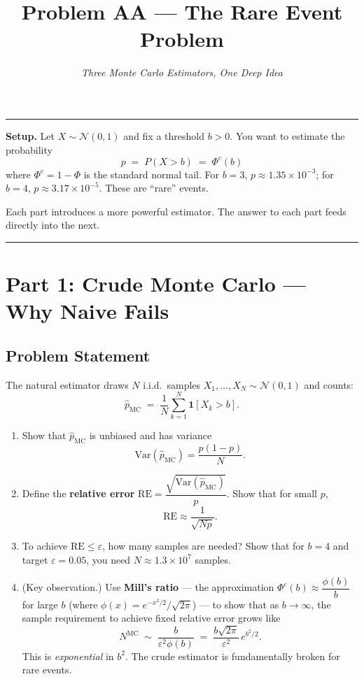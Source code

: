 \documentclass[12pt]{article}
\title{\textbf{Problem AA --- The Rare Event Problem}}
\author{\textit{Three Monte Carlo Estimators, One Deep Idea}}
\date{}
\begin{document}
\maketitle

\hrule
\bigskip

\noindent
\textbf{Setup.}
Let $X \sim \mathcal{N}(0,1)$ and fix a threshold $b > 0$.
You want to estimate the probability
\[
  p \;=\; P(X > b) \;=\; \Phi^c(b)
\]
where $\Phi^c = 1 - \Phi$ is the standard normal tail.
For $b = 3$, $p \approx 1.35 \times 10^{-3}$; for $b = 4$, $p \approx 3.17 \times 10^{-5}$.
These are ``rare'' events.

Each part introduces a more powerful estimator.
The answer to each part feeds directly into the next.

\bigskip\hrule\bigskip

\section*{\textcolor{sectionblue}{Part 1: Crude Monte Carlo --- Why Naive Fails}}

\subsection*{Problem Statement}

The natural estimator draws $N$ i.i.d.\ samples $X_1, \ldots, X_N \sim \mathcal{N}(0,1)$ and counts:
\[
  \hat{p}_{\mathrm{MC}} \;=\; \frac{1}{N}\sum_{k=1}^{N} \mathbf{1}[X_k > b].
\]

\begin{enumerate}[label=(\alph*)]

  \item Show that $\hat{p}_{\mathrm{MC}}$ is unbiased and has variance
  \[
    \mathrm{Var}(\hat{p}_{\mathrm{MC}}) = \frac{p(1-p)}{N}.
  \]

  \item Define the \textbf{relative error}
  $\mathrm{RE} = \dfrac{\sqrt{\mathrm{Var}(\hat{p}_{\mathrm{MC}})}}{p}$.
  Show that for small $p$,
  \[
    \mathrm{RE} \approx \frac{1}{\sqrt{N p}}.
  \]

  \item To achieve $\mathrm{RE} \leq \varepsilon$, how many samples are needed?
  Show that for $b = 4$ and target $\varepsilon = 0.05$, you need
  $N \approx 1.3 \times 10^7$ samples.

  \item (Key observation.)
  Use \textbf{Mill's ratio} --- the approximation
  $\Phi^c(b) \approx \dfrac{\phi(b)}{b}$ for large $b$
  (where $\phi(x) = e^{-x^2/2}/\sqrt{2\pi}$) --- to show that as $b \to \infty$,
  the sample requirement to achieve fixed relative error grows like
  \[
    N^{\mathrm{MC}} \;\sim\; \frac{b}{\varepsilon^2 \phi(b)} \;=\; \frac{b\sqrt{2\pi}}{\varepsilon^2}\,e^{b^2/2}.
  \]
  This is \emph{exponential} in $b^2$.  The crude estimator is fundamentally broken for rare events.

\end{enumerate}
\end{document}
